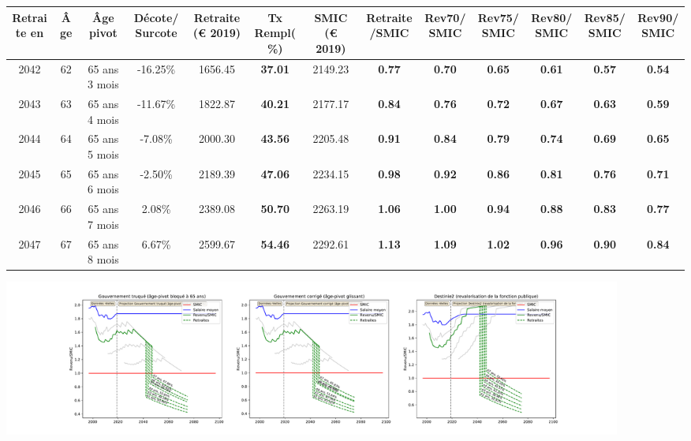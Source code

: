 { \scriptsize \begin{center} 
\begin{tabular}[htb]{|c|c||c|c||c|c||c||c|c|c|c|c|c|} 
\hline 
 Retraite en &  Âge &  Âge pivot &  Décote/Surcote &  Retraite (\euro{} 2019) &  Tx Rempl(\%) &  SMIC (\euro{} 2019) &  Retraite/SMIC &  Rev70/SMIC &  Rev75/SMIC &  Rev80/SMIC &  Rev85/SMIC &  Rev90/SMIC \\ 
\hline \hline 
 2042 &  62 &  65 ans 3 mois &  -16.25\% &  1656.45 &  {\bf 37.01} &  2149.23 &  {\bf {\color{red} 0.77}} &  {\bf {\color{red} 0.70}} &  {\bf {\color{red} 0.65}} &  {\bf {\color{red} 0.61}} &  {\bf {\color{red} 0.57}} &  {\bf {\color{red} 0.54}} \\ 
\hline 
 2043 &  63 &  65 ans 4 mois &  -11.67\% &  1822.87 &  {\bf 40.21} &  2177.17 &  {\bf {\color{red} 0.84}} &  {\bf {\color{red} 0.76}} &  {\bf {\color{red} 0.72}} &  {\bf {\color{red} 0.67}} &  {\bf {\color{red} 0.63}} &  {\bf {\color{red} 0.59}} \\ 
\hline 
 2044 &  64 &  65 ans 5 mois &  -7.08\% &  2000.30 &  {\bf 43.56} &  2205.48 &  {\bf {\color{red} 0.91}} &  {\bf {\color{red} 0.84}} &  {\bf {\color{red} 0.79}} &  {\bf {\color{red} 0.74}} &  {\bf {\color{red} 0.69}} &  {\bf {\color{red} 0.65}} \\ 
\hline 
 2045 &  65 &  65 ans 6 mois &  -2.50\% &  2189.39 &  {\bf 47.06} &  2234.15 &  {\bf {\color{red} 0.98}} &  {\bf {\color{red} 0.92}} &  {\bf {\color{red} 0.86}} &  {\bf {\color{red} 0.81}} &  {\bf {\color{red} 0.76}} &  {\bf {\color{red} 0.71}} \\ 
\hline 
 2046 &  66 &  65 ans 7 mois &  2.08\% &  2389.08 &  {\bf 50.70} &  2263.19 &  {\bf 1.06} &  {\bf 1.00} &  {\bf {\color{red} 0.94}} &  {\bf {\color{red} 0.88}} &  {\bf {\color{red} 0.83}} &  {\bf {\color{red} 0.77}} \\ 
\hline 
 2047 &  67 &  65 ans 8 mois &  6.67\% &  2599.67 &  {\bf 54.46} &  2292.61 &  {\bf 1.13} &  {\bf 1.09} &  {\bf 1.02} &  {\bf {\color{red} 0.96}} &  {\bf {\color{red} 0.90}} &  {\bf {\color{red} 0.84}} \\ 
\hline 
\hline 
\end{tabular} 
\end{center} } 

 \begin{center}\includegraphics[width=0.9\textwidth]{fig/SecretaireAdmin_1980_22_dest_retraite.pdf}\end{center} \label{fig/SecretaireAdmin_1980_22_dest_retraite.pdf} 

